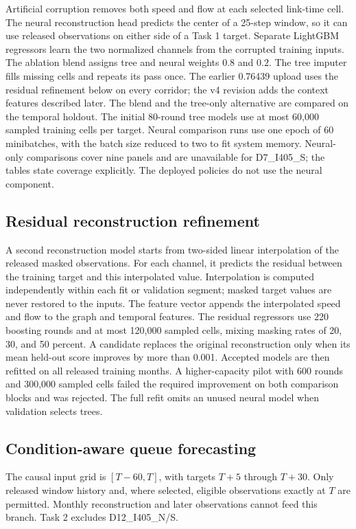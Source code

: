 \documentclass[conference]{IEEEtran}
\begin{document}
Artificial corruption removes both speed and flow at each selected link-time
cell. The neural reconstruction head predicts the center of a 25-step window,
so it can use released observations on either side of a Task 1 target. Separate
LightGBM regressors \cite{lgbm} learn the two normalized channels from the
corrupted training inputs. The ablation blend assigns tree and neural weights $0.8$ and $0.2$. The tree imputer fills missing cells and repeats its pass once. The earlier 0.76439 upload uses the residual refinement below on every corridor; the v4 revision adds the context features described later. The blend and the tree-only alternative are compared on the temporal holdout. The initial 80-round tree models use at most 60,000 sampled training cells per target. Neural comparison runs use one epoch of 60 minibatches, with the batch size reduced to two to fit system memory. Neural-only comparisons cover nine panels and are unavailable for D7\_I405\_S; the tables state coverage explicitly. The deployed policies do not use the neural component.

\subsection{Residual reconstruction refinement}
A second reconstruction model starts from two-sided linear interpolation of the released masked observations. For each channel, it predicts the residual between the training target and this interpolated value. Interpolation is computed independently within each fit or validation segment; masked target values are never restored to the inputs. The feature vector appends the interpolated speed and flow to the graph and temporal features. The residual regressors use 220 boosting rounds and at most 120,000 sampled cells, mixing masking rates of 20, 30, and 50 percent. A candidate replaces the original reconstruction only when its mean held-out score improves by more than 0.001. Accepted models are then refitted on all released training months. A higher-capacity pilot with 600 rounds and 300,000 sampled cells failed the required improvement on both comparison blocks and was rejected. The full refit omits an unused neural model when validation selects trees.

\subsection{Condition-aware queue forecasting}
The causal input grid is $[T-60,T]$, with targets $T+5$ through $T+30$.
Only released window history and, where selected, eligible observations exactly
at $T$ are permitted. Monthly reconstruction and later observations cannot feed
this branch. Task 2 excludes D12\_I405\_N/S.
\end{document}
